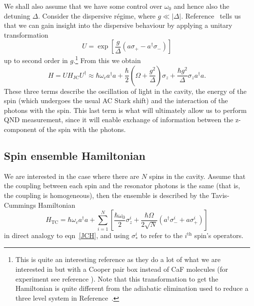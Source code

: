\documentclass{article}
\begin{document}
We shall also assume that we have some control over $\omega_0$ and hence also
the detuning $\Delta$. Consider the dispersive r\'egime, where  $g\ll|\Delta|$.
Reference~\cite{PhysRevA.69.062320} tells us that we can gain insight into the
dispersive behaviour by applying  a unitary transformation
%
\begin{equation} U = \exp \left[\frac{g}{\Delta}(a\sigma_+ -
a^\dagger\sigma_-)\right] \end{equation}
%
up to second order in $g$.\footnote{This is quite an interesting reference as
they do a lot of what we are interested in but with a Cooper pair box instead
of CaF molecules (for experiment see reference \cite{Wallraff2004}). Note that
this transformation to get the Hamiltonian is quite different from the
adiabatic elimination used to reduce a three level system in
Reference~\cite{SchleierSmith2011}.} From this we obtain
%
\begin{equation} H= UH_\text{JC}U^\dagger \approx \hbar \omega_c
  a^\dagger a + \frac{\hbar}{2}\left(\Omega +
  \frac{g^2}{\Delta}\right)\sigma_z + \frac{\hbar
  g^2}{\Delta}\sigma_z a^\dagger a.  \end{equation}
%
These three terms describe the oscillation of light in the cavity, the energy
of the spin (which undergoes the usual AC Stark shift) and the interaction of
the photons with the spin. This last term is what will ultimately allow us to
perform QND measurement, since it will enable exchange of information between
the z-component of the spin with the photons.

\subsection{Spin ensemble Hamiltonian}

We are interested in the case where there are $N$ spins in the
cavity. Assume that the coupling between each spin and the resonator photons is
the same (that is, the coupling is homogeneous), then the ensemble is described
by the Tavis-Cummings Hamiltonian~\cite{Kirton2019}
%
\begin{equation}
  H_\text{TC}=  \hbar \omega_c a^\dagger a + \sum_{i=1}^N\left[
    \frac{\hbar\omega_0}{2}\sigma_z^i +\frac{\hbar\Omega}{2\sqrt{N}}(a^\dagger
    \sigma^i_- + a\sigma^i_+)\right]
\end{equation}
%
in direct analogy to eqn~\ref{JCH}, and using $\sigma_*^i$ to refer to the
$i^\text{th}$ spin's operators.
\end{document}
